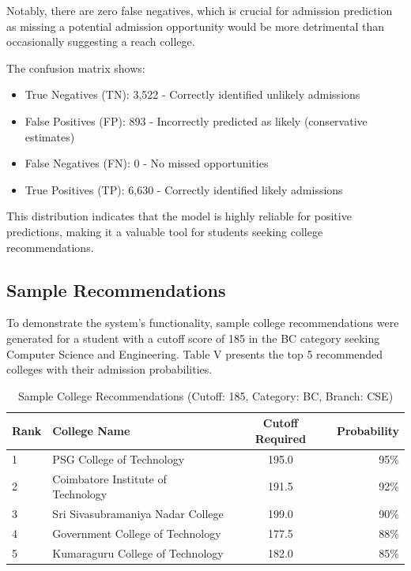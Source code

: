 \documentclass[journal]{IEEEtran}
\begin{document}
Notably, there are zero false negatives, which is crucial for admission prediction as missing a potential admission opportunity would be more detrimental than occasionally suggesting a reach college.

The confusion matrix shows:
\begin{itemize}
\item True Negatives (TN): 3,522 - Correctly identified unlikely admissions
\item False Positives (FP): 893 - Incorrectly predicted as likely (conservative estimates)
\item False Negatives (FN): 0 - No missed opportunities
\item True Positives (TP): 6,630 - Correctly identified likely admissions
\end{itemize}

This distribution indicates that the model is highly reliable for positive predictions, making it a valuable tool for students seeking college recommendations.

\subsection{Sample Recommendations}
To demonstrate the system's functionality, sample college recommendations were generated for a student with a cutoff score of 185 in the BC category seeking Computer Science and Engineering. Table V presents the top 5 recommended colleges with their admission probabilities.

\begin{table}[htbp]
\caption{Sample College Recommendations (Cutoff: 185, Category: BC, Branch: CSE)}
\begin{center}
\begin{tabular}{l l c r}
\hline
\textbf{Rank} & \textbf{College Name} & \textbf{Cutoff Required} & \textbf{Probability} \\
\hline
1 & PSG College of Technology & 195.0 & 95\% \\
2 & Coimbatore Institute of Technology & 191.5 & 92\% \\
3 & Sri Sivasubramaniya Nadar College & 199.0 & 90\% \\
4 & Government College of Technology & 177.5 & 88\% \\
5 & Kumaraguru College of Technology & 182.0 & 85\% \\
\hline
\end{tabular}
\label{tab5}
\end{center}
\end{table}
\end{document}

